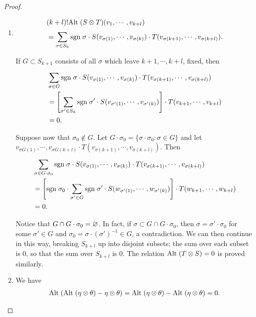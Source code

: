 \begin{proof}
    \begin{enumerate}[label=(\arabic*)]
        \item \;\vspace*{-2em}
            \begin{align*}
                & (k+l)!\mathrm{Alt}\;(S\otimes T)(v_1, \cdots, v_{k+l}) \\
                & = \sum_{\sigma\in S_k}^{}{\mathrm{sgn}\;\sigma\cdot S(v_{\sigma(1)}, \cdots, v_{\sigma(k)})\cdot T(v_{\sigma(k+1)}, \cdots, v_{\sigma(k+l)})}.
            \end{align*}

            If $G\subset S_{k+1}$ consists of all $\sigma$ which leave $k+1, \cdots, k+l$, fixed, then 
            \begin{align*}
                & \sum_{\sigma\in G}^{}{\mathrm{sgn}\;\sigma\cdot S(v_{\sigma(1)}, \cdots, v_{\sigma(k)})\cdot T(v_{\sigma(k+1)}, \cdots, v_{\sigma(k+l)})} \\
                & = \left[\sum_{\sigma'\in S_k}^{}{\mathrm{sgn}\;\sigma'\cdot S(v_{\sigma'(1)}, \cdots, v_{\sigma'(k)})}\right]
                    \cdot T(v_{k+1}, \cdots, v_{k+l}) \\
                & = 0.
            \end{align*} 

            Suppose now that $\sigma_0\notin G$. Let $G\cdot \sigma_0=\{\sigma\cdot\sigma_0:\sigma\in G\}$ and let 
            $v_{\sigma G(1)}, \cdots, v_{\sigma G(k+l)}\cdot T(v_{\sigma(k+1)}, \cdots, v_{\sigma(k+l)})$. Then 
            \begin{align*}
                & \sum_{\sigma\in G\cdot\sigma_0}^{} \mathrm{sgn}\;\sigma\cdot S(v_{\sigma(1)}, \cdots, v_{\sigma(k)})\cdot T(v_{\sigma(k+1)}, \cdots, v_{\sigma(k+l)}) \\
                & = \left[\mathrm{sgn}\;\sigma_0\cdot\sum_{\sigma'\in G}^{}{\mathrm{sgn}\;\sigma'\cdot S(w_{\sigma'(1)}, \cdots, w_{\sigma'(k)})}\right]\cdot T(w_{k+1}, \cdots, w_{k+l}) \\
                & = 0.
            \end{align*}

            Notice that $G\cap G\cdot \sigma_0=\varnothing$. In fact, if $\sigma\subset G\cap G\cdot\sigma_0$,
            then $\sigma=\sigma'\cdot\sigma_0$ for some $\sigma'\in G$ and $\sigma_0=\sigma\cdot (\sigma')^{-1}\in G$,
            a contradiction. We can then continue in this way, breaking $S_{k+l}$ up into disjoint subsets; the 
            sum over each subset is 0, so that the sum over $S_{k+l}$ is 0. The relation $\mathrm{Alt}\;(T\otimes S)=0$ is 
            proved similarly.
        \item We have 
            \begin{align*}
                \mathrm{Alt}\;(\mathrm{Alt}\;(\eta\otimes\theta) - \eta\otimes\theta) 
                = \mathrm{Alt}\;(\eta\otimes\theta) - \mathrm{Alt}\;(\eta\otimes\theta)
                = 0.
            \end{align*}


\end{enumerate}
\end{proof}
